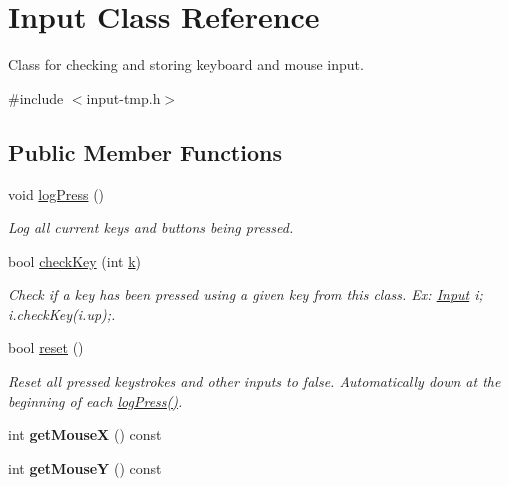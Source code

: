 \hypertarget{classInput}{}\section{Input Class Reference}
\label{classInput}


Class for checking and storing keyboard and mouse input.  




{\ttfamily \#include $<$input-\/tmp.\+h$>$}

\subsection*{Public Member Functions}
\begin{DoxyCompactItemize}
\item 
void \hyperlink{classInput_a7664a52377e4bda7524d288df481954b}{log\+Press} ()\hypertarget{classInput_a7664a52377e4bda7524d288df481954b}{}\label{classInput_a7664a52377e4bda7524d288df481954b}

\begin{DoxyCompactList}\small\item\em Log all current keys and buttons being pressed. \end{DoxyCompactList}\item 
bool \hyperlink{classInput_a2f5d21366e04e3ce200fe73c6c748dd8}{check\+Key} (int \hyperlink{classInput_aa069678fdc7c45c405c044ed8e45a379}{k})\hypertarget{classInput_a2f5d21366e04e3ce200fe73c6c748dd8}{}\label{classInput_a2f5d21366e04e3ce200fe73c6c748dd8}

\begin{DoxyCompactList}\small\item\em Check if a key has been pressed using a given key from this class. Ex\+: \hyperlink{classInput}{Input} i; i.\+check\+Key(i.\+up);. \end{DoxyCompactList}\item 
bool \hyperlink{classInput_ac4fc1b961553d6ca8a603ee0a53f311c}{reset} ()\hypertarget{classInput_ac4fc1b961553d6ca8a603ee0a53f311c}{}\label{classInput_ac4fc1b961553d6ca8a603ee0a53f311c}

\begin{DoxyCompactList}\small\item\em Reset all pressed keystrokes and other inputs to false. Automatically down at the beginning of each \hyperlink{classInput_a7664a52377e4bda7524d288df481954b}{log\+Press()}. \end{DoxyCompactList}\item 
int {\bfseries get\+MouseX} () const \hypertarget{classInput_a08e8c4c83414948fa86aadda2c206569}{}\label{classInput_a08e8c4c83414948fa86aadda2c206569}

\item 
int {\bfseries get\+MouseY} () const \hypertarget{classInput_a403d5f32a558a76422dba94c1121bd70}{}\label{classInput_a403d5f32a558a76422dba94c1121bd70}

\end{DoxyCompactItemize}
